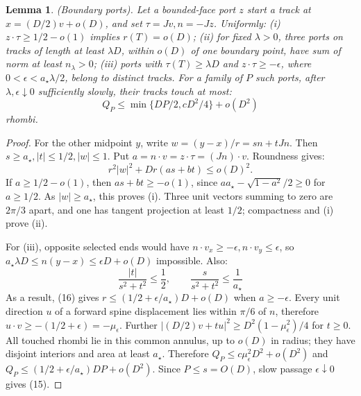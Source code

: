 \documentclass[10pt,reqno]{amsart}
\newtheorem{lemma}{Lemma}[section]
\begin{document}
\begin{lemma}
    (Boundary ports). Let a bounded-face port $z$ start a track at $x = (D / 2)v + o(D)$, and set $\tau = Jv, n = -J z$. Uniformly: (i) $z \cdot \tau \ge 1 / 2 - o(1)$ implies $r(T) = o(D)$; (ii) for fixed $\lambda > 0$, three ports on tracks of length at least $\lambda D$, within $o(D)$ of one boundary point, have sum of norm at least $n_\lambda > 0$; (iii) ports with $\tau(T) \ge \lambda D$ and $z \cdot \tau \ge - \epsilon$, where $0 < \epsilon < a_\star \lambda / 2$, belong to distinct tracks. For a family of $P$ such ports, after $\lambda, \epsilon \downarrow 0$ sufficiently slowly, their tracks touch at most:
    \begin{equation}
        Q_P \le \min \{DP / 2, cD^2 / 4\} + o ( D^2 )
    \end{equation}
    rhombi.
\end{lemma}

\begin{proof}
    For the other midpoint $y$, write $w = (y - x) / r = sn + t J n$. Then $s \ge a_\star, |t| \le 1 / 2, |w| \le 1$. Put $a = n \cdot v = z \cdot \tau = (J n) \cdot v$. Roundness gives:
    \begin{equation}
        r^2 |w|^2 + Dr (as + bt) \le o(D)^2.
    \end{equation}
    If $a \ge 1 / 2 - o(1)$, then $as + bt \ge - o(1)$, since $a a_\star - \sqrt{1 - a^2} / 2 \ge 0$ for $a \ge 1 / 2$. As $|w| \ge a_\star$, this proves (i). Three unit vectors summing to zero are $2 \pi / 3$ apart, and one has tangent projection at least $1 / 2$; compactness and (i) prove (ii).

    For (iii), opposite selected ends would have $n \cdot v_x \ge - \epsilon, n \cdot v_y \le \epsilon$, so $a_\star \lambda D \le n (y - x) \le \epsilon D + o(D)$ impossible. Also:
    \begin{equation}
        \frac{|t|}{s^2 + t^2} \le \frac{1}{2}, \qquad \frac{s}{s^2 + t^2} \le \frac{1}{a_\star}
    \end{equation}
    As a result, (16) gives $r \le ( 1 / 2 + \epsilon / a_\star) D + o(D)$ when $a \ge - \epsilon$. Every unit direction $u$ of a forward spine displacement lies within $\pi / 6$ of $n$, therefore $u \cdot v \ge -(1/2 + \epsilon) = - \mu_\epsilon$. Further $|(D / 2)v + tu|^2 \ge D^2 (1 - \mu_\epsilon^2) / 4$ for $t \ge 0$. All touched rhombi lie in this common annulus, up to $o(D)$ in radius; they have disjoint interiors and area at least $a_\star$. Therefore $Q_P \le c \mu_\epsilon^2 D^2 + o(D^2)$ and $Q_P \le (1 / 2 + \epsilon / a_\star) DP + o(D^2)$. Since $P \le s = O(D)$, slow passage $\epsilon \downarrow 0$ gives (15).
\end{proof}
\end{document}
